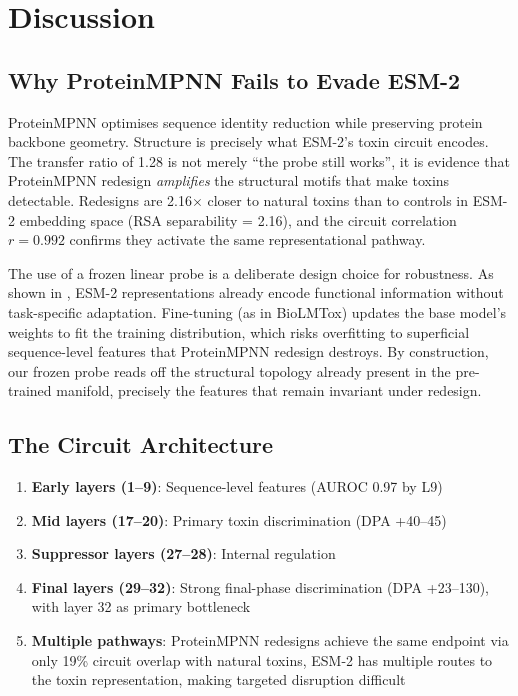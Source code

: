 \documentclass[11pt,a4paper]{article}
\begin{document}
\section{Discussion}

\subsection{Why ProteinMPNN Fails to Evade ESM-2}

ProteinMPNN optimises sequence identity reduction while preserving protein backbone geometry. Structure is precisely what ESM-2's toxin circuit encodes. The transfer ratio of 1.28 is not merely ``the probe still works'', it is evidence that ProteinMPNN redesign \textit{amplifies} the structural motifs that make toxins detectable. Redesigns are 2.16$\times$ closer to natural toxins than to controls in ESM-2 embedding space (RSA separability = 2.16), and the circuit correlation $r = 0.992$ confirms they activate the same representational pathway.

The use of a frozen linear probe is a deliberate design choice for robustness. As shown in \cite{pnas2024peft}, ESM-2 representations already encode functional information without task-specific adaptation. Fine-tuning (as in BioLMTox) updates the base model's weights to fit the training distribution, which risks overfitting to superficial sequence-level features that ProteinMPNN redesign destroys. By construction, our frozen probe reads off the structural topology already present in the pre-trained manifold, precisely the features that remain invariant under redesign.

\subsection{The Circuit Architecture}

\begin{enumerate}
    \item \textbf{Early layers (1--9)}: Sequence-level features (AUROC 0.97 by L9)
    \item \textbf{Mid layers (17--20)}: Primary toxin discrimination (DPA +40--45)
    \item \textbf{Suppressor layers (27--28)}: Internal regulation
    \item \textbf{Final layers (29--32)}: Strong final-phase discrimination (DPA +23--130), with layer 32 as primary bottleneck
    \item \textbf{Multiple pathways}: ProteinMPNN redesigns achieve the same endpoint via only 19\% circuit overlap with natural toxins, ESM-2 has multiple routes to the toxin representation, making targeted disruption difficult
\end{enumerate}
\end{document}
